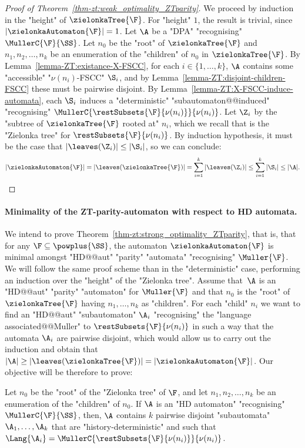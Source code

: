 \documentclass{theoretics}
\begin{document}
\begin{proof}[Proof of Theorem~\ref{thm-zt:weak_optimality_ZTparity}]
	We proceed by induction in the "height" of $\zielonkaTree{\F}$. For "height" $1$, the result is trivial, since $|\zielonkaAutomaton{\F}| = 1$.
	Let $\A$ be a "DPA" "recognising" $\MullerC{\F}{\SS}$. Let $n_0$ be the "root" of $\zielonkaTree{\F}$ and $n_1, n_2, \dots, n_k$ be an enumeration of the "children" of $n_0$ in $\zielonkaTree{\F}$.
	By Lemma~\ref{lemma-ZT:existance-X-FSCC}, for each $i\in \{1, \dots, k\}$, $\A$ contains some "accessible" "$\nu(n_i)$-FSCC" $\S_i$, and by Lemma~\ref{lemma-ZT:disjoint-children-FSCC} these must be pairwise disjoint. By Lemma~\ref{lemma-ZT:X-FSCC-induce-automata}, each $\S_i$ induces a "deterministic" "subautomaton@@induced" "recognising" $\MullerC{\restSubsets{\F}{\nu(n_i)}}{\nu(n_i)}$. Let $\Z_i$ by the "subtree of $\zielonkaTree{\F}$ rooted at" $n_i$, which we recall that is the "Zielonka tree" for $\restSubsets{\F}{\nu(n_i)}$. By induction hypothesis, it must be the case that $|\leaves(\Z_i)| \leq |\S_i|$, so we can conclude:	
	\[ |\zielonkaAutomaton{\F}| = |\leaves(\zielonkaTree{\F})| = \sum\limits_{i=1}^k |\leaves(\Z_i)| \leq  \sum\limits_{i=1}^k |\S_i| \leq |\A|.\qedhere\]
\end{proof}


\paragraph*{Minimality of the ZT-parity-automaton with respect to HD automata.}
We intend to prove Theorem~\ref{thm-zt:strong_optimality_ZTparity}, that is, that for any $\F\subseteq \powplus{\SS}$, the automaton $\zielonkaAutomaton{\F}$ is minimal amongst "HD@@aut" "parity" "automata" "recognising" $\Muller{\F}$. 
We will follow the same proof scheme than in the "deterministic" case, performing an induction over the "height" of the "Zielonka tree". Assume that~$\A$ is an "HD@@aut" "parity" "automaton" for $\Muller{\F}$ and that $n_0$ is the "root" of $\zielonkaTree{\F}$ having $n_1, \dots, n_k$ as "children". For each "child" $n_i$ we want to find an "HD@@aut" "subautomaton" $\A_i$ "recognising" the "language associated@@Muller" to $\restSubsets{\F}{\nu(n_i)}$ in such a way that the automata $\A_i$ are pairwise disjoint, which would allow us to carry out the induction and obtain that $|\A| \geq |\leaves(\zielonkaTree{\F})| = |\zielonkaAutomaton{\F}|$. Our objective will be therefore to prove:

\begin{proposition}\label{prop-ZT:existance-disjoint-subautomata}
	Let $n_0$ be the "root" of the "Zielonka tree" of $\F$, and let $n_1, n_2, \dots, n_k$ be an enumeration of the "children" of $n_0$. If $\A$ is an "HD automaton" "recognising" $\MullerC{\F}{\SS}$, then, $\A$ contains $k$ pairwise disjoint "subautomata" $\A_1, \dots, \A_k$ that are "history-deterministic" and such that $\Lang{\A_i} = \MullerC{\restSubsets{\F}{\nu(n_i)}}{\nu(n_i)}$.
\end{proposition}
\end{document}
